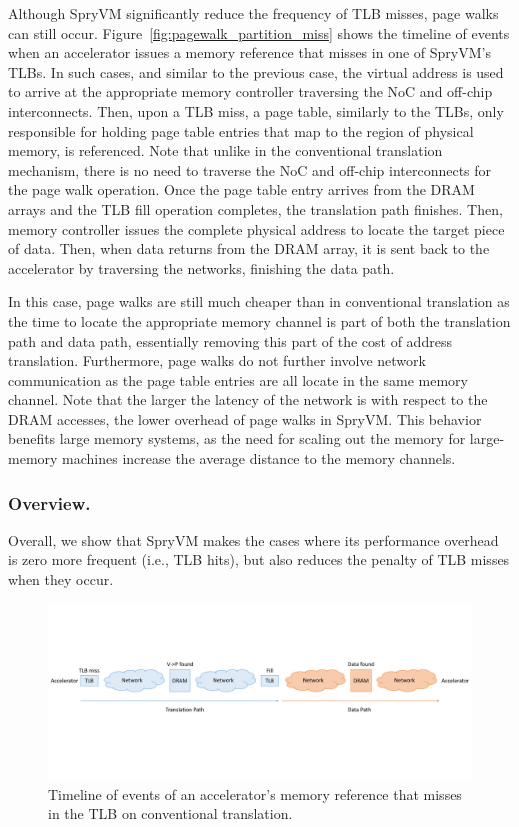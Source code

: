 Although SpryVM significantly reduce the frequency of TLB misses, page walks can still occur. Figure~\ref{fig:pagewalk_partition_miss} shows the timeline of events when an accelerator issues a memory reference that misses in one of SpryVM's TLBs. In such cases, and similar to the previous case, the virtual address is used to arrive at the appropriate memory controller traversing the NoC and off-chip interconnects. Then, upon a TLB miss, a page table, similarly to the TLBs, only responsible for holding page table entries that map to the region of physical memory, is referenced. Note that unlike in the conventional translation mechanism, there is no need to traverse the NoC and off-chip interconnects for the page walk operation. Once the page table entry arrives from the DRAM arrays and the TLB fill operation completes, the translation path finishes. Then, memory controller issues the complete physical address to locate the target piece of data. Then, when data returns from the DRAM array, it is sent back to the accelerator by traversing the networks, finishing the data path.

In this case, page walks are still much cheaper than in conventional translation as the time to locate the appropriate memory channel is part of both the translation path and data path, essentially removing this part of the cost of address translation. Furthermore, page walks do not further involve network communication as the page table entries are all locate in the same memory channel. Note that the larger the latency of the network is with respect to the DRAM accesses, the lower overhead of page walks in SpryVM. This behavior benefits large memory systems, as the need for scaling out the memory for large-memory machines increase the average distance to the memory channels. 

\subsubsection{Overview.} Overall, we show that SpryVM makes the cases where its performance overhead is zero more frequent (i.e., TLB hits), but also reduces the penalty of TLB misses when they occur. 

\begin{figure}
	\includegraphics[width=\textwidth]{figures/time_event_base.pdf}
	\caption{Timeline of events of an accelerator's memory reference that misses in the TLB on conventional translation.}
	\label{fig:pagewalk_base}
\end{figure}

